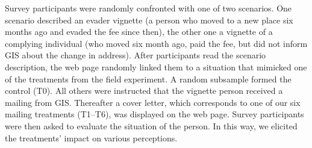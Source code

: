 \documentclass[preprint,inputenc=ansinew,doublespace,notheorems,wider]{jeea}
\begin{document}
Survey participants were randomly confronted with one of two scenarios. One scenario described an evader vignette (a person who moved to a new place six months ago  and evaded the fee since then), the other one a vignette of a complying individual (who moved six month ago, paid the fee, but did not inform GIS about the change in address). After participants read the scenario description, the web page randomly linked them to a situation that mimicked one of the treatments from the field experiment. A random subsample formed the control (T0). All others were instructed that the vignette person received a mailing from GIS. Thereafter a cover letter, which corresponds to one of our six mailing treatments (T1--T6), was displayed on the web page. Survey participants were then asked to evaluate the situation of the person. In this way, we elicited the treatments' impact on various perceptions.
\end{document}
